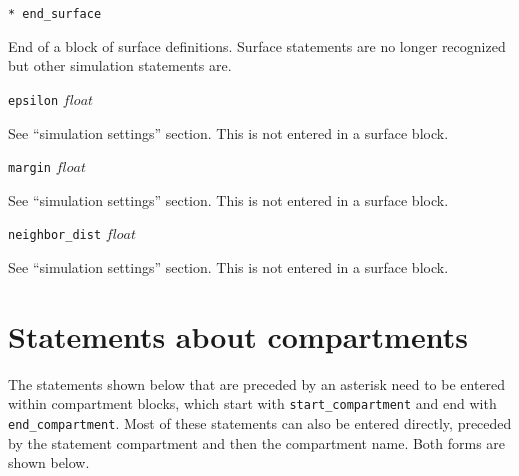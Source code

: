 \documentclass {scrbook}
\newcommand {\ttt} {\texttt}
\begin{document}
\begin{description}
\item{\ttt{* end\_surface}}

End of a block of surface definitions. Surface statements are no longer recognized but other simulation statements are.

\item{\ttt{epsilon} $float$}

See ``simulation settings'' section. This is not entered in a surface block.

\item{\ttt{margin} $float$}

See ``simulation settings'' section. This is not entered in a surface block.

\item{\ttt{neighbor\_dist} $float$}

See ``simulation settings'' section. This is not entered in a surface block.

\end{description}

\section{Statements about compartments}

The statements shown below that are preceded by an asterisk need to be entered within compartment blocks, which start with \ttt{start\_compartment} and end with \ttt{end\_compartment}. Most of these statements can also be entered directly, preceded by the statement compartment and then the compartment name. Both forms are shown below.
\end{document}
